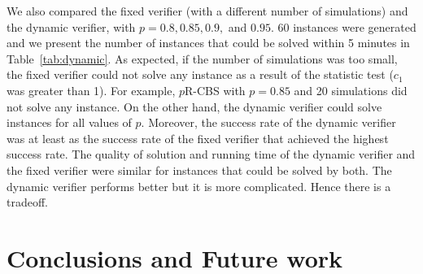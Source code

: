 \documentclass{article}
\newcommand{\prcbs}{$p$R-CBS\xspace}
\begin{document}
\begin{table}[t]
\centering
{}
\caption{Success rate for \prcbs{} out of 60 instances.}
\label{tab:dynamic}
\end{table}

We also compared the fixed verifier (with a different number of simulations) and the dynamic verifier, with $p=0.8,0.85,0.9,$ and $0.95$. 60 instances were generated and we present the number of instances that could be solved within 5 minutes in Table~\ref{tab:dynamic}. As expected, if the number of simulations was too small, the fixed verifier could not solve any instance as a result of the statistic test ($c_1$ was greater than 1). For example, \prcbs{} with $p=0.85$ and 20 simulations did not solve any instance. On the other hand, the dynamic verifier could solve instances for all values of $p$. Moreover, the success rate of the dynamic verifier was at least as the success rate of the fixed verifier that achieved the highest success rate. The quality of solution and running time of the dynamic verifier and the fixed verifier were similar for instances that could be solved by both. The dynamic verifier performs better but it is more complicated. Hence there is a tradeoff.



\section{Conclusions and Future work}
\end{document}

